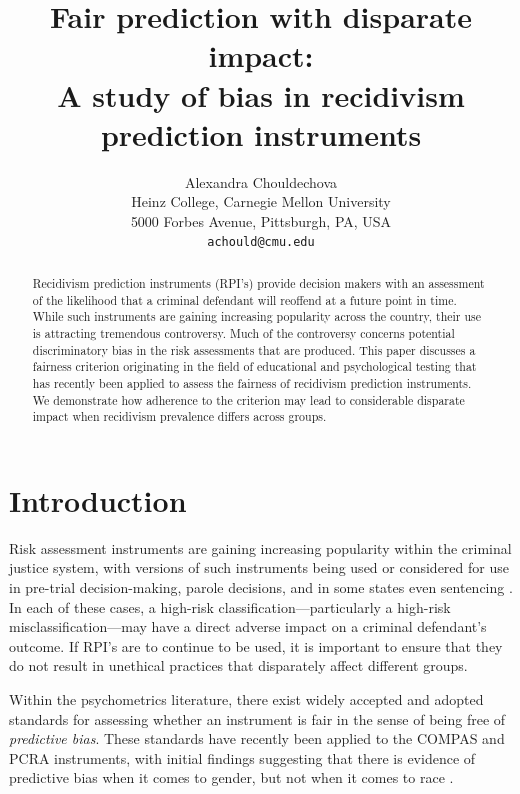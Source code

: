 \documentclass[11pt, svgnames, twocolumn]{article}
\title{\vspace{-1cm} Fair prediction with disparate impact: \\ {\Large A study of bias in recidivism prediction instruments}}
\author{Alexandra Chouldechova \vspace{0.5em} \\
%
Heinz College, Carnegie Mellon University\\
5000 Forbes Avenue, Pittsburgh, PA, USA  \\
{\tt achould@cmu.edu}
}
\date{}
\numberwithin{equation}{section}
\theoremstyle{plain}
\theoremstyle{definition}
\numberwithin{theorem}{section}
\numberwithin{prop}{section}
\numberwithin{corollary}{section}
\numberwithin{definition}{section}
\begin{document}
  \maketitle
  
  
  \begin{abstract}
 Recidivism prediction instruments (RPI's) provide decision makers with an assessment of the likelihood that a criminal defendant will reoffend at a future point in time. While such instruments are gaining increasing popularity across the country, their use is attracting tremendous controversy. Much of the controversy concerns potential discriminatory bias in the risk assessments that are produced. This paper discusses a fairness criterion originating in the field of educational and psychological testing  that has recently been applied to assess the fairness of recidivism prediction instruments. We demonstrate how adherence to the criterion may lead to considerable disparate impact when recidivism prevalence differs across groups. 
  \end{abstract}
  
  \vspace{-0.25em}
  
\section{Introduction} \label{sec:intro}

\vspace{-0.25em}

Risk assessment instruments are gaining increasing popularity within the criminal justice system, with versions of such instruments being used or considered for use in pre-trial decision-making, parole decisions, and in some states even sentencing \citep{blomberg2010validation, 538rpi}.  In each of these cases, a high-risk classification---particularly a high-risk misclassification---may have a direct adverse impact on a criminal defendant's outcome.    If RPI's are to continue to be used, it is important to ensure that they do not result in unethical practices that disparately affect different groups.

Within the psychometrics literature, there exist widely accepted and adopted standards for assessing whether an instrument is fair in the sense of being free of \emph{predictive bias}.  These standards have recently been applied to the COMPAS \cite{compasfaq} and PCRA \cite{pcra} instruments, with initial findings suggesting that there is evidence of predictive bias when it comes to gender, but not when it comes to race \cite{singh2013predictive, skeem2015risk, skeem2016gender}.  
\end{document}

